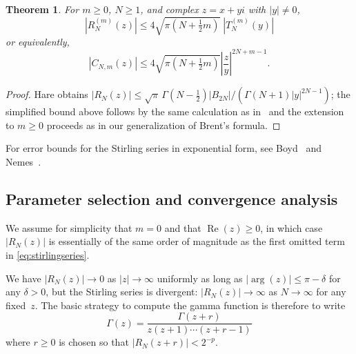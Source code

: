 \documentclass[reqno]{amsart}
\newtheorem{theorem}{Theorem}[section]
\theoremstyle{definition}
\begin{document}
\begin{theorem}
For $m \ge 0$, $N \ge 1$, and complex $z = x + yi$ with $|y| \ne 0$,
\begin{equation}
|R_N^{(m)}(z)| \le 4 \sqrt{\pi (N + \tfrac{1}{2} m)} \; |T_N^{(m)}(y)|
\label{eq:stirbound3}
\end{equation}
or equivalently,
\begin{equation}
|C_{N,m}(z)| \le 4 \sqrt{\pi (N + \tfrac{1}{2} m)} \left| \frac{z}{y} \right|^{2N+m-1}. %
\end{equation}
\end{theorem}

\begin{proof}
Hare obtains $|R_N(z)| \le \sqrt{\pi} \, \Gamma(N-\tfrac{1}{2}) |B_{2N}| / (\Gamma(N+1) |y|^{2N-1} )$; the simplified bound above
follows by the same calculation as in~\cite[Corollary 1]{Brent2018}
and the extension to $m \ge 0$ proceeds as in our
generalization of Brent's formula.
\end{proof}

For error bounds for the Stirling series in exponential
form, see Boyd~\cite{Boyd1994} and Nemes~\cite{Nemes2015}.

\subsection{Parameter selection and convergence analysis}

We assume for simplicity that $m = 0$
and that $\operatorname{Re}(z) \ge 0$,
in which case
$|R_N(z)|$ is essentially of the same order of magnitude as the first omitted
term in \eqref{eq:stirlingseries}.

We have $|R_N(z)| \to 0$ as $|z| \to \infty$ uniformly as long as 
$|\operatorname{arg}(z)| \le \pi - \delta$ for any $\delta > 0$,
but the Stirling series is divergent: $|R_N(z)| \to \infty$ as $N \to \infty$
for any fixed~$z$.
The basic strategy to compute the gamma function is therefore to write
\begin{equation}
\Gamma(z) = \frac{\Gamma(z+r)}{z (z+1) \cdots (z+r-1)}
\end{equation}
where $r \ge 0$ is chosen so that $|R_N(z+r)| < 2^{-p}$.
\end{document}
